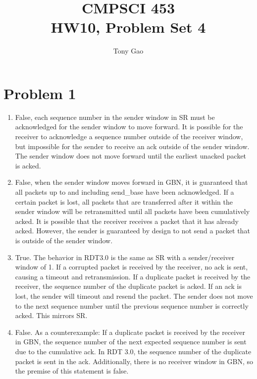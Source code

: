 \documentclass[letter,10pt]{article}
\title{CMPSCI 453\\HW10, Problem Set 4}
\author{Tony Gao}
\begin{document}
\maketitle


\section{Problem 1}

\begin{enumerate}[label=\alph*]
	\item False, each sequence number in the sender window in SR must be acknowledged for the sender window to move forward. It is possible for the receiver to acknowledge a sequence number outside of the receiver window, but impossible for the sender to receive an ack outside of the sender window. The sender window does not move forward until the earliest unacked packet is acked.
	
	\item False, when the sender window moves forward in GBN, it is guaranteed that all packets up to and including send\_base have been acknowledged. If a certain packet is lost, all packets that are transferred after it within the sender window will be retransmitted until all packets have been cumulatively acked. It is possible that the receiver receives a packet that it has already acked. However, the sender is guaranteed by design to not send a packet that is outside of the sender window.
	
	\item True. The behavior in RDT3.0 is the same as SR with a sender/receiver window of 1. If a corrupted packet is received by the receiver, no ack is sent, causing a timeout and retransmission. If a duplicate packet is received by the receiver, the sequence number of the duplicate packet is acked. If an ack is lost, the sender will timeout and resend the packet. The sender does not move to the next sequence number until the previous sequence number is correctly acked. This mirrors SR.
	
	\item False. As a counterexample: If a duplicate packet is received by the receiver in GBN, the sequence number of the next expected sequence number is sent due to the cumulative ack. In RDT 3.0, the sequence number of the duplicate packet is sent in the ack. Additionally, there is no receiver window in GBN, so the premise of this statement is false.
	
\end{enumerate}
\end{document}
